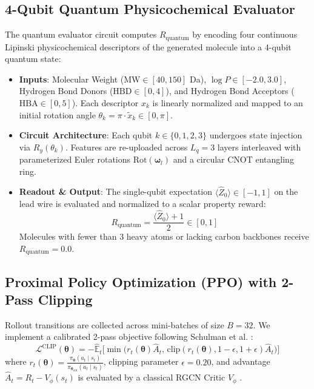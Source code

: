 \documentclass[conference]{IEEEtran}
\begin{document}
\subsection{4-Qubit Quantum Physicochemical Evaluator}
The quantum evaluator circuit computes $R_{\text{quantum}}$ by encoding four continuous Lipinski physicochemical descriptors of the generated molecule into a 4-qubit quantum state:
\begin{itemize}
    \item \textbf{Inputs}: Molecular Weight ($\text{MW} \in [40, 150]$ Da), $\log P \in [-2.0, 3.0]$, Hydrogen Bond Donors ($\text{HBD} \in [0, 4]$), and Hydrogen Bond Acceptors ($\text{HBA} \in [0, 5]$). Each descriptor $x_k$ is linearly normalized and mapped to an initial rotation angle $\theta_k = \pi \cdot \tilde{x}_k \in [0, \pi]$.
    \item \textbf{Circuit Architecture}: Each qubit $k \in \{0, 1, 2, 3\}$ undergoes state injection via $R_y(\theta_k)$. Features are re-uploaded across $L_q=3$ layers interleaved with parameterized Euler rotations $\text{Rot}(\boldsymbol{\omega}_l)$ and a circular CNOT entangling ring.
    \item \textbf{Readout \& Output}: The single-qubit expectation $\langle \hat{Z}_0 \rangle \in [-1, 1]$ on the lead wire is evaluated and normalized to a scalar property reward:
    \begin{equation}
        R_{\text{quantum}} = \frac{\langle \hat{Z}_0 \rangle + 1}{2} \in [0, 1]
    \end{equation}
    Molecules with fewer than 3 heavy atoms or lacking carbon backbones receive $R_{\text{quantum}} = 0.0$.
\end{itemize}

\subsection{Proximal Policy Optimization (PPO) with 2-Pass Clipping}
Rollout transitions are collected across mini-batches of size $B=32$. We implement a calibrated 2-pass objective following Schulman et al. \cite{schulman2017}:
\begin{equation}
    \mathcal{L}^{\text{CLIP}}(\boldsymbol{\theta}) = -\hat{\mathbb{E}}_t \bigl[ \min\bigl( r_t(\boldsymbol{\theta}) \hat{A}_t, \, \text{clip}(r_t(\boldsymbol{\theta}), 1-\epsilon, 1+\epsilon) \hat{A}_t \bigr) \bigr]
\end{equation}
where $r_t(\boldsymbol{\theta}) = \frac{\pi_{\boldsymbol{\theta}}(a_t \mid s_t)}{\pi_{\boldsymbol{\theta}_{\text{old}}}(a_t \mid s_t)}$, clipping parameter $\epsilon = 0.20$, and advantage $\hat{A}_t = R_t - V_\phi(s_t)$ is evaluated by a classical RGCN Critic $V_\phi$ \cite{schlichtkrull2018modeling}.
\end{document}
